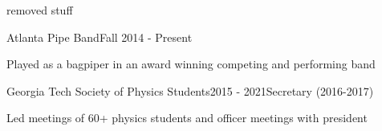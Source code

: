 \documentclass{resume} %
\begin{document}
\iffalse

\begin{rSection}{removed stuff}
  \begin{rSubsection}{Atlanta Pipe Band}{Fall 2014 - Present}{}{}
  \item Played as a bagpiper in an award winning competing and performing band
  \end{rSubsection}

  \begin{rSubsection}{Georgia Tech Society of Physics Students}{2015 - 2021}{Secretary (2016-2017)}{}
  \item Led meetings of 60+ physics students and officer meetings with president
  \end{rSubsection}


\end{rSection}
\end{document}
